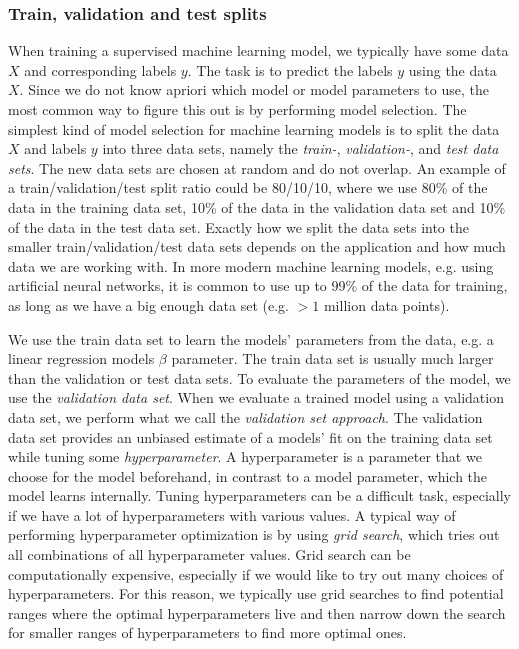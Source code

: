 \subsubsection{Train, validation and test splits}
\label{sec:train-val-test-splits}
When training a supervised machine learning model, we typically have some data $X$ and corresponding labels $y$. The task is to predict the labels $y$ using the data $X$. Since we do not know apriori which model or model parameters to use, the most common way to figure this out is by performing model selection. The simplest kind of model selection for machine learning models is to split the data $X$ and labels $y$ into three data sets, namely the \textit{train-}, \textit{validation-}, and \textit{test data sets}. The new data sets are chosen at random and do not overlap. An example of a train/validation/test split ratio could be 80/10/10, where we use 80\% of the data in the training data set, 10\% of the data in the validation data set and 10\% of the data in the test data set. Exactly how we split the data sets into the smaller train/validation/test data sets depends on the application and how much data we are working with. In more modern machine learning models, e.g. using artificial neural networks, it is common to use up to 99\% of the data for training, as long as we have a big enough data set (e.g. $>1$ million data points).

We use the train data set to learn the models' parameters from the data, e.g. a linear regression models $\beta$ parameter. The train data set is usually much larger than the validation or test data sets. To evaluate the parameters of the model, we use the \textit{validation data set}. When we evaluate a trained model using a validation data set, we perform what we call the \textit{validation set approach}. The validation data set provides an unbiased estimate of a models' fit on the training data set while tuning some \textit{hyperparameter}. A hyperparameter is a parameter that we choose for the model beforehand, in contrast to a model parameter, which the model learns internally. Tuning hyperparameters can be a difficult task, especially if we have a lot of hyperparameters with various values. A typical way of performing hyperparameter optimization is by using \textit{grid search}, which tries out all combinations of all hyperparameter values. Grid search can be computationally expensive, especially if we would like to try out many choices of hyperparameters. For this reason, we typically use grid searches to find potential ranges where the optimal hyperparameters live and then narrow down the search for smaller ranges of hyperparameters to find more optimal ones.

